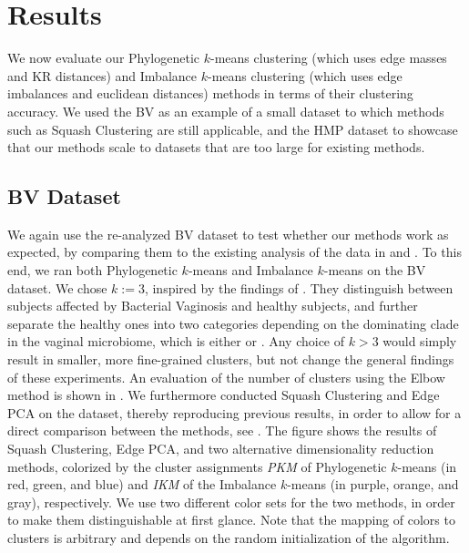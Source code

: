 
\section{Results}
\label{ch:Clustering:sec:Results}

We now evaluate our Phylogenetic $k$-means clustering (which uses edge masses and KR distances) and
Imbalance $k$-means clustering (which uses edge imbalances and euclidean distances) methods in terms of their clustering accuracy.
We used the \ac{BV} as an example of a small dataset to which methods such as Squash Clustering \cite{Matsen2011a} are still applicable,
and the \ac{HMP} dataset to showcase that our methods scale to datasets that are too large for existing methods.


\subsection{BV Dataset}
\label{ch:Clustering:sec:Results:sub:BVDataset}

We again use the re-analyzed \ac{BV} dataset to test whether our methods work as expected,
by comparing them to the existing analysis of the data in \cite{Srinivasan2012} and \cite{Matsen2011a}.
To this end, we ran both Phylogenetic $k$-means and Imbalance $k$-means on the \ac{BV} dataset.
We chose $k:=3$, inspired by the findings of \cite{Srinivasan2012}.
They distinguish between subjects affected by Bacterial Vaginosis and healthy subjects,
and further separate the healthy ones into two categories depending on the dominating clade in the vaginal microbiome,
which is either  or .
Any choice of $k > 3$ would simply result in smaller, more fine-grained clusters,
but not change the general findings of these experiments.
An evaluation of the number of clusters using the Elbow method is shown in .
We furthermore conducted Squash Clustering and Edge PCA on the dataset,
thereby reproducing previous results, in order to allow for a direct comparison between the methods,
see .
The figure shows the results of Squash Clustering, Edge PCA, and two alternative dimensionality reduction methods,
colorized by the cluster assignments \emph{PKM} of Phylogenetic $k$-means (in red, green, and blue)
and \emph{IKM} of the Imbalance $k$-means (in purple, orange, and gray), respectively.
We use two different color sets for the two methods, in order to make them distinguishable at first glance.
Note that the mapping of colors to clusters is arbitrary and depends on the random initialization of the algorithm.


